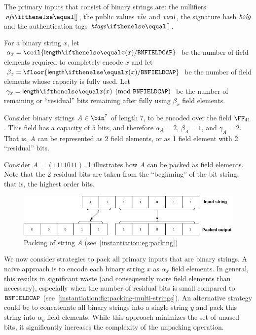 The primary inputs that consist of binary strings are: the nullifiers $\nfs{}$, the public values $\mathit{vin}$ and $\mathit{vout}$, the signature hash $\mathit{hsig}$ and the authentication tags $\htags{}$.

For a binary string $x$, let $\alpha_x = \ceil{\len{x} / \bnFieldBitCap}$ be the number of field elements required to completely encode $x$ and let $\beta_x = \floor{\len{x} / \bnFieldBitCap}$ be the number of field elements whose capacity is fully used. Let $\gamma_x = \len{x} \pmod{\bnFieldBitCap}$ be the number of remaining or ``residual'' bits remaining after fully using $\beta_x$ field elements.

\begin{example}\label{instantiation:eg:packing}
    Consider binary strings $A \in \bin^7$ of length 7, to be encoded over the field $\FFx{41}$. This field has a capacity of $5$ bits, and therefore $\alpha_A = 2$, $\beta_A = 1$, and $\gamma_A = 2$. That is, $A$ can be represented as 2 field elements, or as 1 field element with 2 ``residual'' bits.

    Consider $A = (1111011)$. \cref{instantiation:fig:packingA} illustrates how $A$ can be packed as field elements. Note that the 2 residual bits are taken from the ``beginning'' of the bit string, that is, the highest order bits.
\end{example}

\begin{figure}[ht]
    \centering
    \includegraphics[width=1\textwidth]{images/bit-packing-stringA.png}
    \caption{Packing of string $A$ (see~\cref{instantiation:eg:packing})}\label{instantiation:fig:packingA}
\end{figure}

We now consider strategies to pack all primary inputs that are binary strings. A naive approach is to encode each binary string $x$ as $\alpha_x$ field elements. In general, this results in significant waste (and consequently more field elements than necessary), especially when the number of residual bits is small compared to $\mathtt{BNFIELDCAP}$ (see~\cref{instantiation:fig:packing-multi-strings}). An alternative strategy could be to concatenate all binary strings into a single string $y$ and pack this string into $\alpha_y$ field elements. While this approach minimizes the set of unused bits, it significantly increases the complexity of the unpacking operation.

